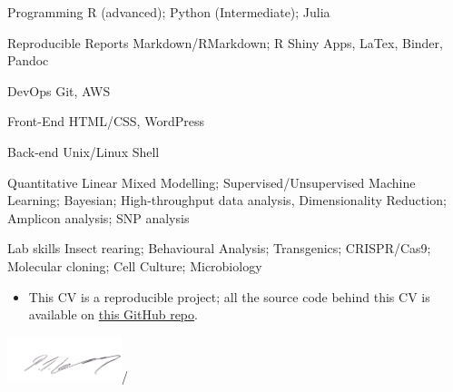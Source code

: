 \documentclass[11pt, a4paper]{awesome-cv}
\providecommand{\tightlist}{%
	\setlength{\itemsep}{0pt}\setlength{\parskip}{0pt}}
\begin{document}
\begin{cvskills}
  \cvskill
    {Programming}
    {R (advanced); Python (Intermediate); Julia}
    
  \cvskill
    {Reproducible Reports}
    {Markdown/RMarkdown; R Shiny Apps, LaTex, Binder, Pandoc}
   
  \cvskill
    {DevOps}
    {Git, AWS}  
    
  \cvskill
    {Front-End}
    {HTML/CSS, WordPress} 
    
  \cvskill
    {Back-end}
    {Unix/Linux Shell}
    
  \cvskill
    {Quantitative}
    {Linear Mixed Modelling; Supervised/Unsupervised Machine Learning; Bayesian; \newline High-throughput data analysis, Dimensionality Reduction; Amplicon analysis; SNP analysis}
    
  \cvskill
    {Lab skills}
    {Insect rearing; Behavioural Analysis; Transgenics; CRISPR/Cas9; Molecular cloning; \newline Cell Culture; Microbiology}
    
\end{cvskills}

\begin{itemize}
\tightlist
\item
  This CV is a reproducible project; all the source code behind this CV
  is available on \href{https://github.com/Philip-Leftwich/PL_CV}{this
  GitHub repo}.
\end{itemize}

\includegraphics[width=0.25\textwidth,height=0.1\textheight]{data/PL_sig.png}/
\end{document}
